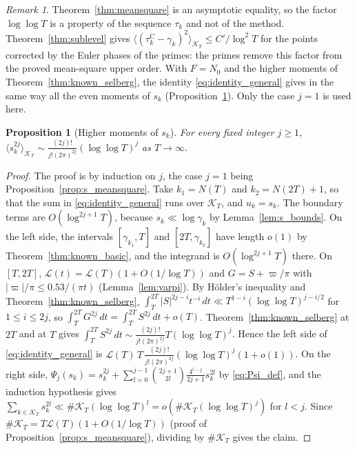 \documentclass[11pt,a4paper]{article}
\makeatletter
\numberwithin{equation}{section}
\DeclareRobustCommand{\CGref}[1]{\ref{#1}}
\DeclareRobustCommand{\CGeqref}[1]{\eqref{#1}}
\let\CG@origref\ref
\let\CG@origeqref\eqref
\newcommand{\CG@gettip}[1]{\@ifundefined{CGTip@#1}{#1}{\csname CGTip@#1\endcsname}}
\DeclareRobustCommand{\CGref}[1]{\pdftooltip{\CG@origref{#1}}{\CG@gettip{#1}}}
\DeclareRobustCommand{\CGeqref}[1]{\pdftooltip{\CG@origeqref{#1}}{\CG@gettip{#1}}}
\newtheorem{proposition}[theorem]{Proposition}
\theoremstyle{definition}
\theoremstyle{remark}
\newtheorem{remark}[theorem]{Remark}
\newcommand{\Nz}{N_0} %
\newcommand{\lL}{\mathcal L}
\newcommand{\Kc}{\mathcal K}
\makeatother
\begin{document}
\begin{remark}\label{rem:meansquare_comparison}
Theorem~\CGref{thm:meansquare} is an asymptotic equality, so the factor $\log\log T$ is a property of the sequence $\tau_k$ and not of the method. Theorem~\CGref{thm:sublevel} gives $\langle(\tau_{k}^{\mathrm C}-\gamma_k)^2\rangle_{\Kc_T}\le C'/\log^2T$ for the points corrected by the Euler phases of the primes: the primes remove this factor from the proved mean-square upper order. With $F=\Nz$ and the higher moments of Theorem~\CGref{thm:known_selberg}, the identity \CGeqref{eq:identity_general} gives in the same way all the even moments of $s_k$ (Proposition~\CGref{prop:higher_moments}). Only the case $j=1$ is used here.
\end{remark}

\begin{proposition}[Higher moments of $s_k$]\label{prop:higher_moments}
For every fixed integer $j\ge1$, $\langle s_k^{2j}\rangle_{\Kc_T}\sim\frac{(2j)!}{j!(2\pi)^{2j}}(\log\log T)^j$ as $T\to\infty$.
\end{proposition}

\begin{proof}
The proof is by induction on $j$, the case $j=1$ being Proposition~\CGref{prop:s_meansquare}. Take $k_1=N(T)$ and $k_2=N(2T)+1$, so that the sum in \CGeqref{eq:identity_general} runs over $\Kc_T$, and $u_k=s_k$. The boundary terms are $O(\log^{2j+1}T)$, because $s_k\ll\log\gamma_k$ by Lemma~\CGref{lem:s_bounds}. On the left side, the intervals $[\gamma_{k_1},T]$ and $[2T,\gamma_{k_2}]$ have length $o(1)$ by Theorem~\CGref{thm:known_basic}, and the integrand is $O(\log^{2j+1}T)$ there. On $[T,2T]$, $\lL(t)=\lL(T)(1+O(1/\log T))$ and $G=S+\varpi/\pi$ with $|\varpi|/\pi\le0.53/(\pi t)$ (Lemma~\CGref{lem:varpi}). By Hölder's inequality and Theorem~\CGref{thm:known_selberg}, $\int_T^{2T}|S|^{2j-i}t^{-i}\,dt\ll T^{1-i}(\log\log T)^{j-i/2}$ for $1\le i\le2j$, so $\int_T^{2T}G^{2j}\,dt=\int_T^{2T}S^{2j}\,dt+o(T)$. Theorem~\CGref{thm:known_selberg} at $2T$ and at $T$ gives $\int_T^{2T}S^{2j}\,dt\sim\frac{(2j)!}{j!(2\pi)^{2j}}T(\log\log T)^j$. Hence the left side of \CGeqref{eq:identity_general} is $\lL(T)\,T\,\frac{(2j)!}{j!(2\pi)^{2j}}(\log\log T)^j(1+o(1))$. On the right side, $\Psi_j(s_k)=s_k^{2j}+\sum_{l=0}^{j-1}\binom{2j+1}{2l}\frac{4^{l-j}}{2j+1}s_k^{2l}$ by \CGeqref{eq:Psi_def}, and the induction hypothesis gives $\sum_{k\in\Kc_T}s_k^{2l}\ll\#\Kc_T(\log\log T)^l=o(\#\Kc_T(\log\log T)^j)$ for $l<j$. Since $\#\Kc_T=T\lL(T)(1+O(1/\log T))$ (proof of Proposition~\CGref{prop:s_meansquare}), dividing by $\#\Kc_T$ gives the claim.
\end{proof}
\end{document}
